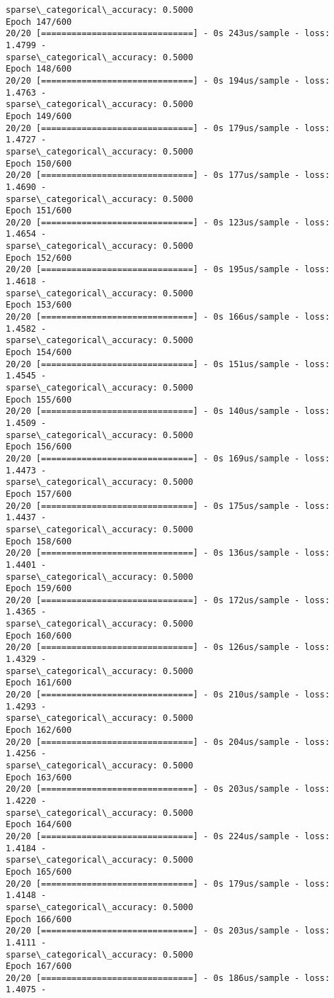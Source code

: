 \documentclass[11pt]{article}
\begin{document}
\begin{Verbatim}[commandchars=\\\{\}]
sparse\_categorical\_accuracy: 0.5000
Epoch 147/600
20/20 [==============================] - 0s 243us/sample - loss: 1.4799 -
sparse\_categorical\_accuracy: 0.5000
Epoch 148/600
20/20 [==============================] - 0s 194us/sample - loss: 1.4763 -
sparse\_categorical\_accuracy: 0.5000
Epoch 149/600
20/20 [==============================] - 0s 179us/sample - loss: 1.4727 -
sparse\_categorical\_accuracy: 0.5000
Epoch 150/600
20/20 [==============================] - 0s 177us/sample - loss: 1.4690 -
sparse\_categorical\_accuracy: 0.5000
Epoch 151/600
20/20 [==============================] - 0s 123us/sample - loss: 1.4654 -
sparse\_categorical\_accuracy: 0.5000
Epoch 152/600
20/20 [==============================] - 0s 195us/sample - loss: 1.4618 -
sparse\_categorical\_accuracy: 0.5000
Epoch 153/600
20/20 [==============================] - 0s 166us/sample - loss: 1.4582 -
sparse\_categorical\_accuracy: 0.5000
Epoch 154/600
20/20 [==============================] - 0s 151us/sample - loss: 1.4545 -
sparse\_categorical\_accuracy: 0.5000
Epoch 155/600
20/20 [==============================] - 0s 140us/sample - loss: 1.4509 -
sparse\_categorical\_accuracy: 0.5000
Epoch 156/600
20/20 [==============================] - 0s 169us/sample - loss: 1.4473 -
sparse\_categorical\_accuracy: 0.5000
Epoch 157/600
20/20 [==============================] - 0s 175us/sample - loss: 1.4437 -
sparse\_categorical\_accuracy: 0.5000
Epoch 158/600
20/20 [==============================] - 0s 136us/sample - loss: 1.4401 -
sparse\_categorical\_accuracy: 0.5000
Epoch 159/600
20/20 [==============================] - 0s 172us/sample - loss: 1.4365 -
sparse\_categorical\_accuracy: 0.5000
Epoch 160/600
20/20 [==============================] - 0s 126us/sample - loss: 1.4329 -
sparse\_categorical\_accuracy: 0.5000
Epoch 161/600
20/20 [==============================] - 0s 210us/sample - loss: 1.4293 -
sparse\_categorical\_accuracy: 0.5000
Epoch 162/600
20/20 [==============================] - 0s 204us/sample - loss: 1.4256 -
sparse\_categorical\_accuracy: 0.5000
Epoch 163/600
20/20 [==============================] - 0s 203us/sample - loss: 1.4220 -
sparse\_categorical\_accuracy: 0.5000
Epoch 164/600
20/20 [==============================] - 0s 224us/sample - loss: 1.4184 -
sparse\_categorical\_accuracy: 0.5000
Epoch 165/600
20/20 [==============================] - 0s 179us/sample - loss: 1.4148 -
sparse\_categorical\_accuracy: 0.5000
Epoch 166/600
20/20 [==============================] - 0s 203us/sample - loss: 1.4111 -
sparse\_categorical\_accuracy: 0.5000
Epoch 167/600
20/20 [==============================] - 0s 186us/sample - loss: 1.4075 -

\end{Verbatim}
\end{document}
